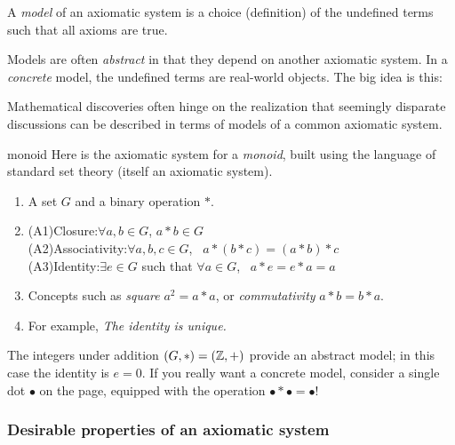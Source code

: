 \begin{defn}{}{}
	A \emph{model} of an axiomatic system is a choice (definition) of the undefined terms such that all axioms are true.
\end{defn}

Models are often \emph{abstract} in that they depend on another axiomatic system. In a \emph{concrete} model, the undefined terms are real-world objects. The big idea is this:
\begin{quote}
\end{quote}
Mathematical discoveries often hinge on the realization that seemingly disparate discussions can be described in terms of models of a common axiomatic system.



\begin{example}{}{monoid}
	Here is the axiomatic system for a \emph{monoid}, built using the language of standard set theory (itself an axiomatic system).
 	\begin{enumerate}
	  \item A set $G$ and a binary operation $\ast$.
	  \item (A1)\lstsp Closure:\quad $\forall a,b\in G$, $a\ast b\in G$\\
  	\lstsp(A2)\lstsp Associativity:\quad $\forall a,b,c\in G$, \ $a\ast(b\ast c)=(a\ast b)\ast c$\\
  	\lstsp(A3)\lstsp Identity:\quad $\exists e\in G$ such that $\forall a\in G$, \ $a\ast e=e\ast a=a$
	  \item Concepts such as \emph{square} $a^2=a\ast a$, or \emph{commutativity} $a\ast b=b\ast a$.
	  \item For example, \emph{The identity is unique.}
 	\end{enumerate}
 	The integers under addition $(G,*)=(\mathbb{Z},+)$ provide an abstract model; in this case the identity is $e=0$.\smallbreak
 	If you really want a concrete model, consider a single dot $\bullet$ on the page, equipped with the operation $\bullet *\bullet =\bullet$!
\end{example}



\subsubsection*{Desirable properties of an axiomatic system}

